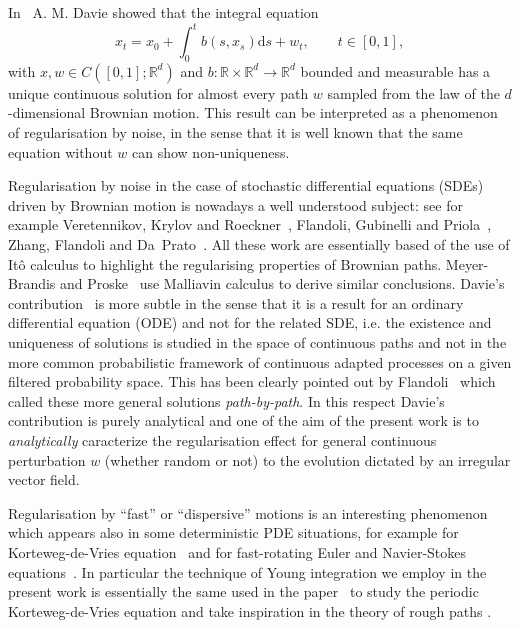 \documentclass[a4paper,11pt]{article}
\newcommand{\mathd}{\mathrm{d}}
\newcommand{\tmem}[1]{{\em #1\/}}
\newcommand{\RR}{\mathbb R}
\begin{document}
In~{\cite{MR2377011}} A. M. Davie showed that the integral equation
\begin{equation}
  \label{eq:ODE-0} x_{t} =x_{0} + \int_{0}^{t} b (s,x_{s} ) \mathd s+w_{t} ,
  \hspace{2em} t \in [0,1],
\end{equation}
with $x,w \in C ([0,1]; \RR^{d} )$ and $b: \RR \times \RR^{d} \to \RR^{d}$
bounded and measurable has a unique continuous solution for almost every path
$w$ sampled from the law of the $d$-dimensional Brownian motion. This result
can be interpreted as a phenomenon of regularisation by noise, in the sense
that it is well known that the same equation without $w$ can show
non-uniqueness.

Regularisation by noise in the case of stochastic differential equations
(SDEs) driven by Brownian motion is nowadays a well understood subject: see
for example Veretennikov, Krylov and Roeckner~{\cite{MR2117951}}, Flandoli,
Gubinelli and Priola~{\cite{FGP}}, Zhang, Flandoli and Da~Prato~{\cite{DF}}.
All these work are essentially based of the use of Itô calculus to highlight
the regularising properties of Brownian paths. Meyer-Brandis and
Proske~{\cite{MR2606880}} use Malliavin calculus to derive similar
conclusions. Davie's contribution~{\cite{MR2377011}} is more subtle in the
sense that it is a result for an ordinary differential equation (ODE) and not
for the related SDE, i.e. the existence and uniqueness of solutions is studied
in the space of continuous paths and not in the more common probabilistic
framework of continuous adapted processes on a given filtered probability
space. This has been clearly pointed out by
Flandoli~{\cite{flandoli_random_2011}} which called these more general
solutions {\tmem{path-by-path}}. In this respect Davie's contribution is
purely analytical and one of the aim of the present work is to
{\tmem{analytically}} caracterize the regularisation effect for general
continuous perturbation $w$ (whether random or not) to the evolution dictated
by an irregular vector field.



Regularisation by ``fast'' or ``dispersive'' motions is an interesting
phenomenon which appears also in some deterministic PDE situations, for
example for Korteweg-de-Vries equation~{\cite{kdv,BIT}} and for fast-rotating
Euler and Navier-Stokes equations~{\cite{BMN}}. In particular the technique of
Young integration we employ in the present work is essentially the same used
in the paper~{\cite{kdv}} to study the periodic Korteweg-de-Vries equation and
take inspiration in the theory of rough paths {\cite{Lyons,controlling,FV}}.
\end{document}
